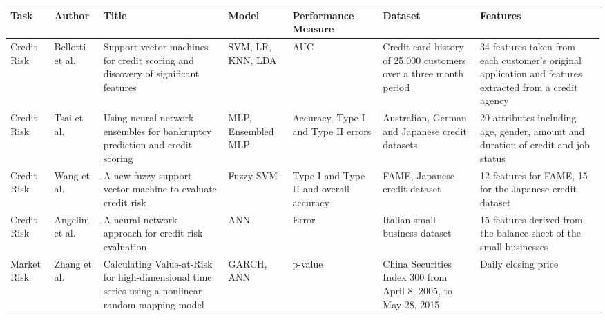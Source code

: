 \documentclass[a4paper, 12pt]{article}
\begin{document}
\begin{table}[H]
\label{table2}
\vskip 0.1in
\bgroup
\def\arraystretch{1.5}
\begin{tabular}{ | p{1.9cm} | p{1.6cm}| p{2.1cm} | p{1.4cm}| p{2.3cm}| p{1.9cm}| p{2.2cm}| }
\hline
\textbf{Task} & \textbf{Author}  & \textbf{Title}  & \textbf{Model} & \textbf{Performance Measure}  & \textbf{Dataset}  & \textbf{Features} \\
  \hline
Credit Risk &
Bellotti et al. \cite{bellotti2009support} &
Support vector machines for credit scoring and discovery of significant features &
SVM, LR, KNN, LDA &
AUC &
Credit card history of 25,000 customers over a three month period &
34 features taken from each customer’s original application and features extracted from a credit agency
\\
 \hline
 Credit Risk &
Tsai et al. \cite{tsai2008using} &
Using neural network ensembles for bankruptcy prediction and credit scoring &
MLP, Ensembled MLP &
Accuracy, Type I and Type II errors &
Australian, German and Japanese credit datasets &
20 attributes including age, gender, amount and duration of credit and job status
\\
\hline

Credit Risk &
Wang et al. \cite{wang2005new} &
A new fuzzy support vector machine to evaluate credit risk &
Fuzzy SVM &
Type I and Type II and overall accuracy &
FAME, Japanese credit dataset &
12 features for FAME, 15 for the Japanese credit dataset 
\\
\hline


Credit Risk &
Angelini et al. \cite{angelini2008neural} &
A neural network approach for credit risk evaluation &
ANN &
Error &
Italian small business dataset &
15 features derived from the balance sheet of the small businesses
\\
\hline

Market Risk &
Zhang et al. \cite{zhang2017calculating} &
Calculating Value-at-Risk for high-dimensional time series using a nonlinear random mapping model &
GARCH, ANN &
p-value &
China Securities Index 300 from April 8, 2005, to May 28, 2015 &
Daily closing price
\\
\hline
\end{tabular}
\egroup
\end{table}
\newpage
\end{document}

